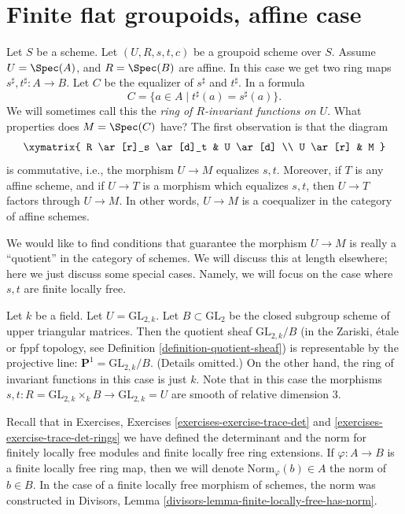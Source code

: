 \section{Finite flat groupoids, affine case}
\label{section-finite-flat}

\noindent
Let $S$ be a scheme.
Let $(U, R, s, t, c)$ be a groupoid scheme over $S$.
Assume $U = \Spec(A)$, and $R = \Spec(B)$ are affine.
In this case we get two ring maps
$s^\sharp, t^\sharp : A \longrightarrow B$.
Let $C$ be the equalizer of $s^\sharp$ and $t^\sharp$. In a formula
\begin{equation}
\label{equation-invariants}
C = \{a \in A \mid t^\sharp(a) = s^\sharp(a) \}.
\end{equation}
We will sometimes call this the {\it ring of $R$-invariant functions on $U$}.
What properties does $M = \Spec(C)$ have? The first observation is
that the diagram
$$
\xymatrix{
R \ar[r]_s \ar[d]_t & U \ar[d] \\
U \ar[r] & M
}
$$
is commutative, i.e., the morphism $U \to M$ equalizes $s, t$.
Moreover, if $T$ is any affine scheme, and if $U \to T$ is
a morphism which equalizes $s, t$, then $U \to T$ factors through $U \to M$.
In other words, $U \to M$ is a coequalizer in the category of affine schemes.

\medskip\noindent
We would like to find conditions that guarantee the morphism $U \to M$ is
really a ``quotient'' in the category of schemes. We will discuss this at
length elsewhere; here we just discuss some
special cases. Namely, we will focus on the case where $s, t$ are finite
locally free.

\begin{example}
\label{example-quotient-projective-line}
Let $k$ be a field. Let $U = \text{GL}_{2, k}$. Let $B \subset \text{GL}_2$
be the closed subgroup scheme of upper triangular matrices.
Then the quotient sheaf $\text{GL}_{2, k}/B$ (in the Zariski, \'etale or
fppf topology, see Definition \ref{definition-quotient-sheaf}) is
representable by the projective line: $\mathbf{P}^1 = \text{GL}_{2, k}/B$.
(Details omitted.)
On the other hand, the ring of invariant functions in this case is just $k$.
Note that in this case the morphisms
$s, t : R = \text{GL}_{2, k} \times_k B \to \text{GL}_{2, k} = U$ are smooth
of relative dimension $3$.
\end{example}

\noindent
Recall that in Exercises, Exercises \ref{exercises-exercise-trace-det} and
\ref{exercises-exercise-trace-det-rings} we have defined the determinant
and the norm for finitely locally free modules and finite locally free ring
extensions. If $\varphi : A \to B$ is a finite locally free ring map, then
we will denote $\text{Norm}_\varphi(b) \in A$ the norm of $b \in B$. In the
case of a finite locally free morphism of schemes, the norm was constructed
in Divisors, Lemma \ref{divisors-lemma-finite-locally-free-has-norm}.

